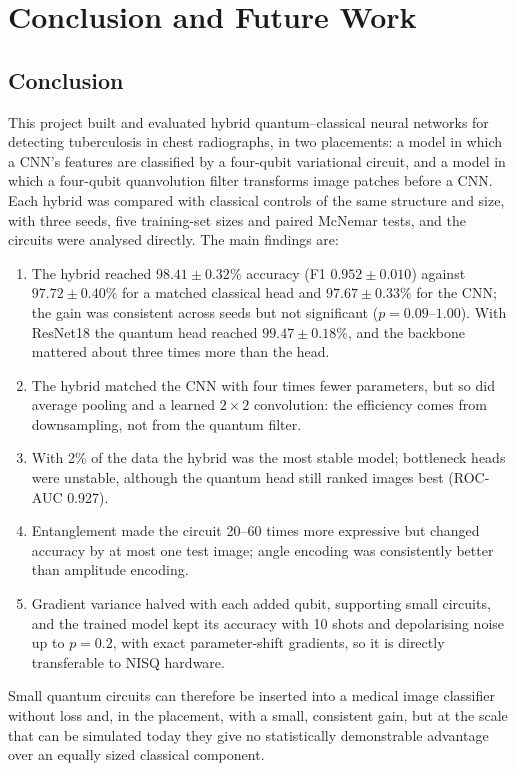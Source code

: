 \chapter{Conclusion and Future Work}
\label{ch:conclusion}

\section{Conclusion}
This project built and evaluated hybrid quantum--classical neural networks
for detecting tuberculosis in chest radiographs, in two placements: a \cq{}
model in which a CNN's features are classified by a four-qubit variational
circuit, and a \qc{} model in which a four-qubit quanvolution filter
transforms image patches before a CNN. Each hybrid was compared with
classical controls of the same structure and size, with three seeds, five
training-set sizes and paired McNemar tests, and the circuits were analysed
directly. The main findings are:
\begin{enumerate}
  \item The \cq{} hybrid reached $98.41 \pm 0.32\%$ accuracy (F1
        $0.952 \pm 0.010$) against $97.72 \pm 0.40\%$ for a matched
        classical head and $97.67 \pm 0.33\%$ for the CNN; the gain was
        consistent across seeds but not significant ($p = 0.09$--$1.00$).
        With ResNet18 the quantum head reached $99.47 \pm 0.18\%$, and the
        backbone mattered about three times more than the head.
  \item The \qc{} hybrid matched the CNN with four times fewer parameters,
        but so did average pooling and a learned $2\times2$ convolution: the
        efficiency comes from downsampling, not from the quantum filter.
  \item With 2\% of the data the \qc{} hybrid was the most stable model;
        bottleneck heads were unstable, although the quantum head still
        ranked images best (ROC-AUC 0.927).
  \item Entanglement made the circuit 20--60 times more expressive but
        changed accuracy by at most one test image; angle encoding was
        consistently better than amplitude encoding.
  \item Gradient variance halved with each added qubit, supporting small
        circuits, and the trained model kept its accuracy with 10 shots and
        depolarising noise up to $p = 0.2$, with exact parameter-shift
        gradients, so it is directly transferable to NISQ hardware.
\end{enumerate}
Small quantum circuits can therefore be inserted into a medical image
classifier without loss and, in the \cq{} placement, with a small,
consistent gain, but at the scale that can be simulated today they give no
statistically demonstrable advantage over an equally sized classical
component.

